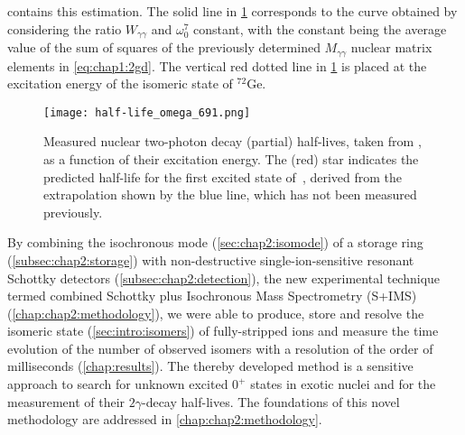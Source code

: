  contains this estimation. 
\newpar
The solid line in \cref{fig:chap1:extrapolation} corresponds to the curve obtained by considering the ratio $W_{\gamma\gamma}$ and $\omega_{0}^{7}$ constant, with the constant being the average value of the sum of squares of the previously determined \cite{Schirmer-1984, Kramp-1987} $M_{\gamma\gamma}$ nuclear matrix elements in \cref{eq:chap1:2gd}. The vertical red dotted line in \cref{fig:chap1:extrapolation} is placed at the excitation energy of the isomeric state of $^{72}\mathrm{Ge}$.
\newpar
\begin{figure}[hbt]
    \centering
    \texttt{[image: half-life\_omega\_691.png]}
    \caption{Measured nuclear two-photon decay (partial) half-lives, taken from \cite{Schirmer-1984, Kramp-1987}, as a function of their excitation energy. The (red) star indicates the predicted half-life for the first excited state of \,, derived from the extrapolation shown by the blue line, which has not been measured previously.}
    \label{fig:chap1:extrapolation}
\end{figure}

By combining the isochronous mode (\cref{sec:chap2:isomode}) of a storage ring (\cref{subsec:chap2:storage}) with non-destructive single-ion-sensitive resonant Schottky detectors (\cref{subsec:chap2:detection}), the new experimental technique termed combined Schottky plus Isochronous Mass Spectrometry (\textsc{S+IMS}) (\cref{chap:chap2:methodology}), we were able to produce, store and resolve the isomeric state (\cref{sec:intro:isomers}) of fully-stripped ions and measure the time evolution of the number of observed isomers with a resolution of the order of milliseconds (\cref{chap:results}).
The thereby developed method is a sensitive approach to search for unknown excited $0^+$ states in exotic nuclei and for the measurement of their $2\gamma$-decay half-lives.
The foundations of this novel methodology are addressed in \cref{chap:chap2:methodology}.
\begin{center}
    \vspace*{1cm}
    \vspace*{\fill}
\end{center}
